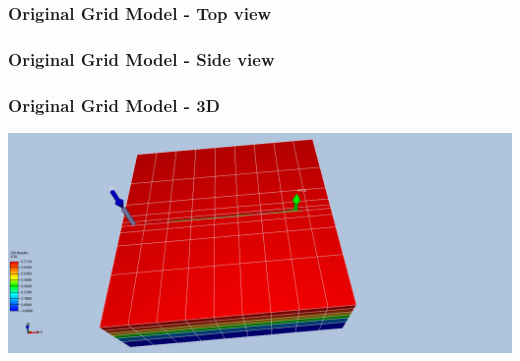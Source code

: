 \begin{frame}
    \frametitle{Original Grid Model - Top view}
    \footnotesize
    \vspace{-1.5em}
    \begin{center}
        
    \end{center}
\end{frame}


\begin{frame}
    \frametitle{Original Grid Model - Side view}
    \begin{center}
        
    \end{center}
\end{frame}


\begin{frame}
    \frametitle{Original Grid Model - 3D}
    \begin{center}
        \includegraphics[width=\textwidth]{figures/resinsight/1b-start.png}
    \end{center}
\end{frame}



